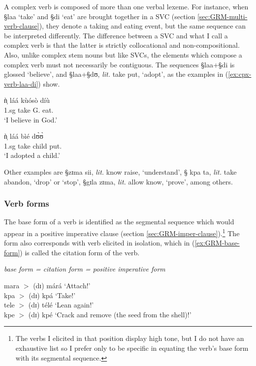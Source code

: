 A complex verb is  composed of more than one verbal lexeme. For
instance, when {\S laa} `take' and {\S di}
`eat' are brought together in a SVC (section \ref{sec:GRM-multi-verb-clause}),
they denote a taking and eating event, but
the same sequence can be interpreted  differently. The difference between a
SVC  and what I call a complex verb is that the latter is strictly
collocational and non-compositional. Also, unlike complex stem nouns but like
SVCs, the elements which compose a complex verb
must not necessarily be contiguous.  The sequences  {\S laa}+{\S di}
is glossed  `believe', and {\S laa}+{\S dʊ}, {\it lit.} take put,  `adopt', as
the examples in  (\ref{ex:cpx-verb-laa-di}) show.

\begin{exe}
\ex\label{ex:cpx-verb-laa-di}
\begin{xlist}
\ex
 \gll ǹ̩ láá kùósò díù \\
{\sc 1.sg} take G.  eat.{\foc}  \\
\glt `I believe in God.'

\ex
 \gll  ǹ̩ láá bìé dʊ̀ʊ̀ \\
{\sc 1.sg} take child put.{\foc}  \\
\glt `I adopted a child.'

\end{xlist}
\end{exe}

Other examples are {\S zɪma sii}, {\it lit.} know raise, `understand',  {\S
kpa ta}, {\it lit.}  take abandon, `drop' or `stop', {\S gɪla zɪma}, {\it lit.}
allow know, `prove', among others. 



\subsubsection{Verb forms}
\label{sec:GRM-verb-word}

The base form of a verb is identified as the segmental sequence which  would
appear in a positive imperative clause (section
\ref{sec:GRM-imper-clause}).\footnote{The verbs I elicited in that position
display high tone, but I do not have an exhaustive list so I prefer only to be
specific in equating the verb's base form with its segmental sequence.}
The form also corresponds  with verb elicited in isolation, which in
(\ref{ex:GRM-base-form}) is called the  citation form of the verb. 

\begin{exe}
\ex\label{ex:GRM-base-form}{\it base form = citation form = positive
imperative form}
\begin{xlist}
mara $>$ (dɪ) márá  `Attach!' \\
kpa  $>$  (dɪ)  kpá  `Take!'\\
tele  $>$  (dɪ)  télé  `Lean again!'\\
kpe $>$   (dɪ)  kpé  `Crack and remove (the seed from the shell)!'

\end{xlist}
\end{exe}




